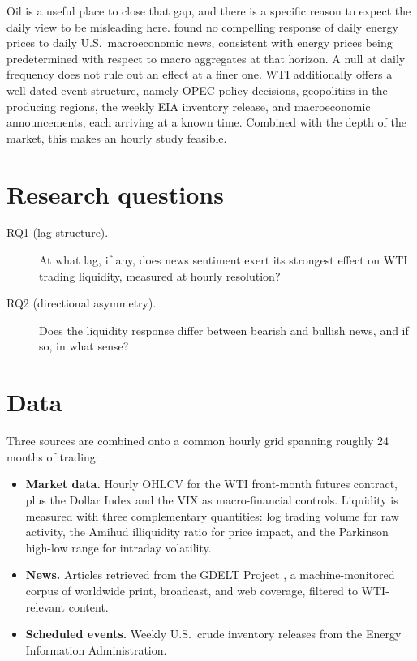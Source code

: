 \documentclass[11pt,a4paper]{article}
\begin{document}
Oil is a useful place to close that gap, and there is a specific reason to expect the daily view to be misleading here. \citet{kilian_vega2011} found no compelling response of daily energy prices to daily U.S.\ macroeconomic news, consistent with energy prices being predetermined with respect to macro aggregates at that horizon. A null at daily frequency does not rule out an effect at a finer one. WTI additionally offers a well-dated event structure, namely OPEC policy decisions, geopolitics in the producing regions, the weekly EIA inventory release, and macroeconomic announcements, each arriving at a known time. Combined with the depth of the market, this makes an hourly study feasible.

\section{Research questions}

\begin{description}
  \item[RQ1 (lag structure).] At what lag, if any, does news sentiment exert its strongest effect on WTI trading liquidity, measured at hourly resolution?
  \item[RQ2 (directional asymmetry).] Does the liquidity response differ between bearish and bullish news, and if so, in what sense?
\end{description}

\section{Data}

Three sources are combined onto a common hourly grid spanning roughly 24 months of trading:

\begin{itemize}
  \item \textbf{Market data.} Hourly OHLCV for the WTI front-month futures contract, plus the Dollar Index and the VIX as macro-financial controls. Liquidity is measured with three complementary quantities: log trading volume for raw activity, the Amihud illiquidity ratio \citep{amihud2002} for price impact, and the Parkinson high-low range \citep{parkinson1980} for intraday volatility.
  \item \textbf{News.} Articles retrieved from the GDELT Project \citep{leetaru_schrodt2013}, a machine-monitored corpus of worldwide print, broadcast, and web coverage, filtered to WTI-relevant content.
  \item \textbf{Scheduled events.} Weekly U.S.\ crude inventory releases from the Energy Information Administration.
\end{itemize}
\end{document}
